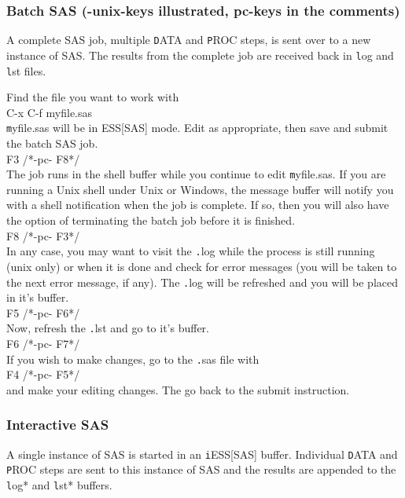 \documentclass{article}
\newcommand{\elcode}[1]{\\{\texttt\hspace*{2em} #1}\\}
\begin{document}
\subsubsection{Batch SAS (-unix-keys illustrated, pc-keys in the comments)}
\label{sec:SAS:batch}
A complete SAS job, multiple {\texttt DATA} and {\texttt PROC} steps,
is sent over to a new instance of SAS.  The results from the complete
job are received back in {\texttt log} and {\texttt lst} files.

Find the file you want to work with
    \elcode{C-x C-f myfile.sas}
{\texttt myfile.sas} will be in ESS[SAS] mode.
Edit as appropriate, then save and submit the batch SAS job.
    \elcode{F3  /*-pc- F8*/}
The job runs in the shell buffer while you continue to edit 
{\texttt myfile.sas}.  If you are running a Unix shell under Unix or
Windows, the message buffer will notify you with a shell
notification when the job is complete.  If so, then you 
will also have the option of terminating the batch job
before it is finished.
    \elcode{F8  /*-pc- F3*/}
In any case, you may want to visit the {\texttt .log} while the process
is still running (unix only) or when it is done and check for
error messages 
(you will be taken to the next error message, if any).
The {\texttt .log} will be refreshed and you will be placed in it's buffer.
    \elcode{F5  /*-pc- F6*/}
Now, refresh the {\texttt .lst} and go to it's buffer.
    \elcode{F6  /*-pc- F7*/}
If you wish to make changes, go to the {\texttt .sas} file with
    \elcode{F4 /*-pc- F5*/}
and make your editing changes.  The go back to the submit instruction.

\subsubsection{Interactive SAS}
A single instance of SAS is started in an {\texttt iESS[SAS]} buffer.  Individual
{\texttt DATA} and {\texttt PROC} steps are sent to this instance of SAS and the results
are appended to the {\texttt *log*} and {\texttt *lst*} buffers.
\end{document}
